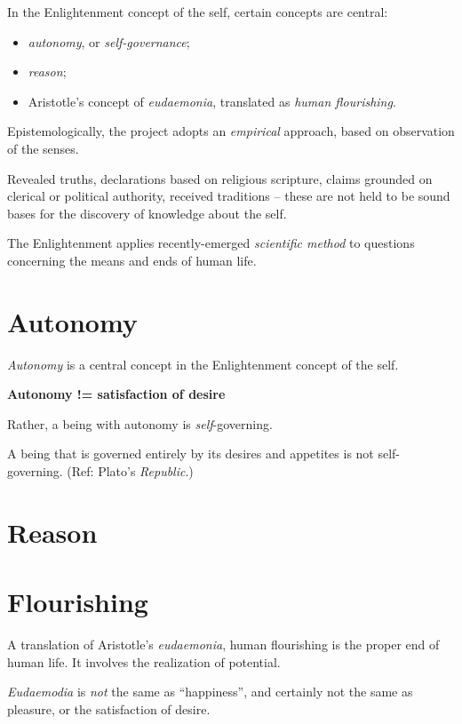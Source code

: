 \documentclass[
]{book}
\providecommand{\tightlist}{%
  \setlength{\itemsep}{0pt}\setlength{\parskip}{0pt}}
\begin{document}
In the Enlightenment concept of the self, certain concepts are central:

\begin{itemize}
\tightlist
\item
  \emph{autonomy}, or \emph{self-governance};
\item
  \emph{reason};
\item
  Aristotle's concept of \emph{eudaemonia}, translated as \emph{human flourishing}.
\end{itemize}

Epistemologically, the project adopts an \emph{empirical} approach, based on observation of the senses.

Revealed truths, declarations based on religious scripture, claims grounded on clerical or political authority, received traditions -- these are not held to be sound bases for the discovery of knowledge about the self.

The Enlightenment applies recently-emerged \emph{scientific method} to questions concerning the means and ends of human life.

\hypertarget{autonomy}{%
\section{Autonomy}\label{autonomy}}

\emph{Autonomy} is a central concept in the Enlightenment concept of the self.

\textbf{Autonomy != satisfaction of desire}

Rather, a being with autonomy is \emph{self}-governing.

A being that is governed entirely by its desires and appetites is not self-governing.
(Ref: Plato's \emph{Republic}.)

\hypertarget{reason}{%
\section{Reason}\label{reason}}

\hypertarget{flourishing}{%
\section{Flourishing}\label{flourishing}}

A translation of Aristotle's \emph{eudaemonia}, human flourishing is the proper end of human life. It involves the realization of potential.

\emph{Eudaemodia} is \emph{not} the same as ``happiness'', and certainly not the same as pleasure, or the satisfaction of desire.
\end{document}
